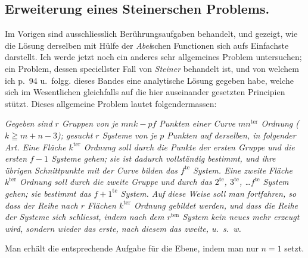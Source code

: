 \documentclass{article}
\begin{document}
\subsection*{Erweiterung eines Steinerschen Problems.}

Im Vorigen sind ausschliesslich Berührungsaufgaben behandelt, und gezeigt, wie die Lösung derselben mit Hülfe der \emph{Abel}schen Functionen sich aufs Einfachste darstellt. Ich werde jetzt noch ein anderes sehr allgemeines Problem untersuchen; ein Problem, dessen speciellster Fall von \emph{Steiner} behandelt ist, und von welchem ich p.\ 94 u.\ folgg. dieses Bandes eine analytische Lösung gegeben habe, welche sich im Wesentlichen gleichfalls auf die hier auseinander gesetzten Principien stützt. Dieses allgemeine Problem lautet folgendermassen:

\emph{Gegeben sind $r$ Gruppen von je $mnk-pf$ Punkten einer Curve $mn^{\text{ter}}$ Ordnung ($k \geqq m+n-3$); gesucht $r$ Systeme von je $p$ Punkten auf derselben, in folgender Art. Eine Fläche $k^{\text{ter}}$ Ordnung soll durch die Punkte der ersten Gruppe und die ersten $f-1$ Systeme gehen; sie ist dadurch vollständig bestimmt, und ihre übrigen Schnittpunkte mit der Curve bilden das $f^{\text{te}}$ System. Eine zweite Fläche $k^{\text{ter}}$ Ordnung soll durch die zweite Gruppe und durch das $2^{\text{te}}$, $3^{\text{te}}$, \ldots $f^{\text{te}}$ System gehen; sie bestimmt das $f+1^{\text{te}}$ System. Auf diese Weise soll man fortfahren, so dass der Reihe nach $r$ Flächen $k^{\text{ter}}$ Ordnung gebildet werden, und dass die Reihe der Systeme sich schliesst, indem nach dem $r^{\text{ten}}$ System kein neues mehr erzeugt wird, sondern wieder das erste, nach diesem das zweite, u.\ s.\ w.}

Man erhält die entsprechende Aufgabe für die Ebene, indem man nur $n=1$ setzt.
\end{document}
